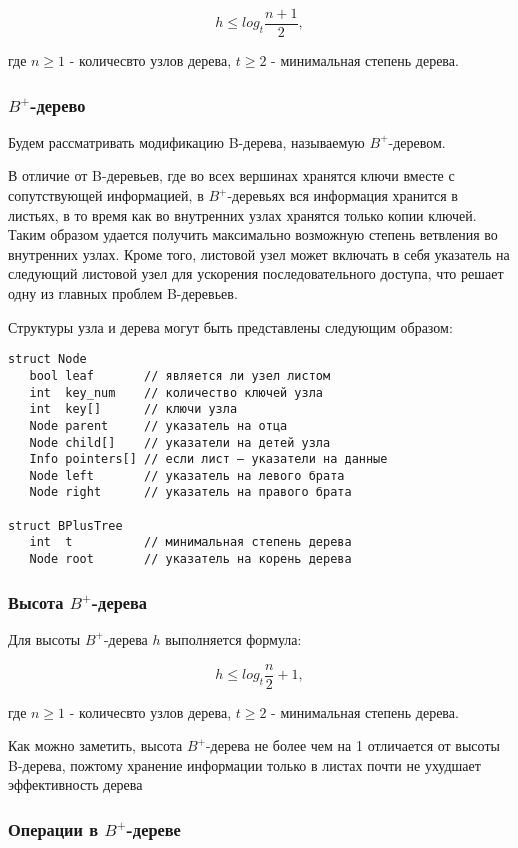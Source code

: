 \documentclass[14pt, russian]{scrartcl}
\begin{document}
$$h \le log_t \frac{n + 1}{2},$$

где $n \ge 1$ - количесвто узлов дерева, $t \ge 2$ - минимальная степень дерева.

\subsubsection{$B^+$-дерево}
Будем рассматривать модификацию B-дерева, называемую \textbf{$B^+$}-деревом.

В отличие от B-деревьев, где  во всех вершинах хранятся ключи вместе с сопутствующей информацией, в $B^+$-деревьях вся информация хранится в листьях, в то время как во внутренних узлах хранятся только копии ключей. Таким образом удается получить максимально возможную степень ветвления во внутренних узлах. Кроме того, листовой узел может включать в себя указатель на следующий листовой узел для ускорения последовательного доступа, что решает одну из главных проблем B-деревьев. 

Структуры узла и дерева могут быть представлены следующим образом:
\begin{verbatim}
struct Node
   bool leaf       // является ли узел листом
   int  key_num    // количество ключей узла
   int  key[]      // ключи узла
   Node parent     // указатель на отца
   Node child[]    // указатели на детей узла
   Info pointers[] // если лист — указатели на данные
   Node left       // указатель на левого брата
   Node right      // указатель на правого брата

struct BPlusTree
   int  t          // минимальная степень дерева
   Node root       // указатель на корень дерева
\end{verbatim}

\subsubsection{Высота $B^+$-дерева}
Для высоты  $B^+$-дерева $h$ выполняется формула:

$$h \le log_t \frac{n}{2} + 1,$$

где $n \ge 1$ - количесвто узлов дерева, $t \ge 2$ - минимальная степень дерева. 

Как можно заметить, высота $B^+$-дерева не более чем на 1 отличается от высоты B-дерева, пожтому хранение информации только в листах почти не ухудшает эффективность дерева 

\subsubsection{Операции в $B^+$-дереве}
\end{document}
